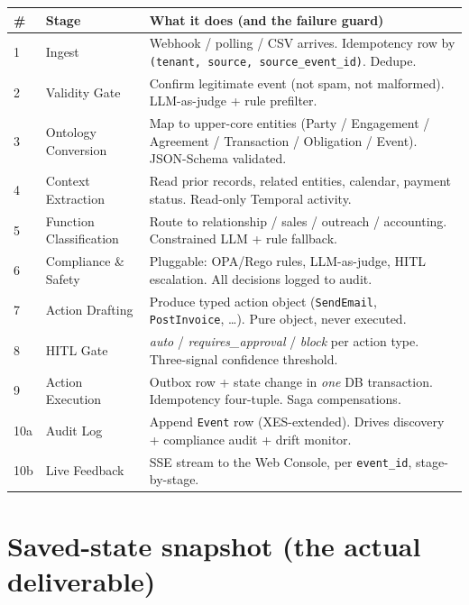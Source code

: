 \documentclass[11pt,a4paper]{article}
\renewcommand{\arraystretch}{1.15}
\begin{document}
\begin{center}
\renewcommand{\arraystretch}{1.15}
\begin{tabularx}{\linewidth}{@{}p{0.55cm}p{3.3cm}X@{}}
\toprule
\rowcolor{accentlight}\textbf{\#} & \textbf{Stage} & \textbf{What it does (and the failure guard)}\\
\midrule
1 & Ingest                 & Webhook / polling / CSV arrives. Idempotency row by \texttt{(tenant, source, source\_event\_id)}. Dedupe. \\
2 & Validity Gate          & Confirm legitimate event (not spam, not malformed). LLM-as-judge + rule prefilter. \\
3 & Ontology Conversion    & Map to upper-core entities (Party / Engagement / Agreement / Transaction / Obligation / Event). JSON-Schema validated. \\
4 & Context Extraction     & Read prior records, related entities, calendar, payment status. Read-only Temporal activity. \\
5 & Function Classification& Route to relationship / sales / outreach / accounting. Constrained LLM + rule fallback. \\
6 & Compliance \& Safety   & Pluggable: OPA/Rego rules, LLM-as-judge, HITL escalation. All decisions logged to audit. \\
7 & Action Drafting        & Produce typed action object (\texttt{SendEmail}, \texttt{PostInvoice}, \dots). Pure object, never executed. \\
8 & HITL Gate              & \emph{auto} / \emph{requires\_approval} / \emph{block} per action type. Three-signal confidence threshold. \\
9 & Action Execution       & Outbox row + state change in \emph{one} DB transaction. Idempotency four-tuple. Saga compensations. \\
10a & Audit Log           & Append \texttt{Event} row (XES-extended). Drives discovery + compliance audit + drift monitor. \\
10b & Live Feedback       & SSE stream to the Web Console, per \texttt{event\_id}, stage-by-stage. \\
\bottomrule
\end{tabularx}
\end{center}

\section{Saved-state snapshot (the actual deliverable)}
\end{document}
